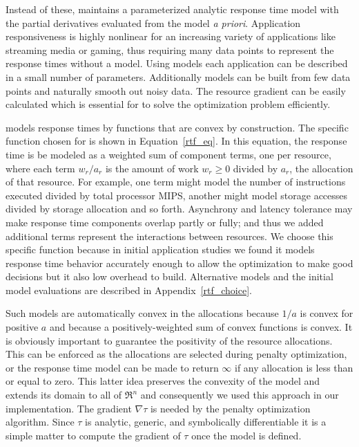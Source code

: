 Instead of these, \pacora maintains a parameterized analytic response time model with the partial derivatives evaluated from the model \emph{a priori}. Application responsiveness is highly nonlinear for an increasing variety of applications like streaming media or gaming, thus requiring many data points to represent the response times without a model. Using models each application can be described in a small number of parameters.  Additionally models can be built from few data points and naturally smooth out noisy data. The resource gradient can be easily calculated which is essential for \pacora to solve the optimization problem efficiently.  

\pacora models response times by functions that are convex by construction.  The specific function chosen for \pacora is shown in Equation~\ref{rtf_eq}.  In this equation, the response time is be modeled as a weighted sum of component terms, one per resource, where each term $w_r/a_r$ is the amount of work $w_r \geq 0$ divided by $a_r$, the allocation of that resource\cite{Snav}. For example, one term might model the number of instructions executed divided by total processor MIPS, another might model storage accesses divided by storage allocation and so forth. Asynchrony and latency tolerance may make response time components overlap partly or fully; and thus we added additional terms represent the interactions between resources. We choose this specific function because in initial application studies we found it models response time behavior accurately enough to allow the optimization to make good decisions but it also low overhead to build.  Alternative models and the initial model evaluations are described in Appendix~\ref{rtf_choice}.

Such models are automatically convex in the allocations because $1/a$ is convex for positive $a$ and because a positively-weighted sum of convex functions is convex.  It is obviously important to guarantee the positivity of the resource allocations. This can be enforced as the allocations are selected during penalty optimization, or the response time model can be made to return $\infty$ if any allocation is less than or equal to zero. This latter idea preserves the convexity of the model and extends its domain to all of $\Re^n$ and consequently we used this approach in our implementation. The gradient $\nabla\tau$ is needed by the penalty optimization algorithm.
Since $\tau$ is analytic, generic, and symbolically differentiable
it is a simple matter to compute the gradient of $\tau$ once the model is defined.

